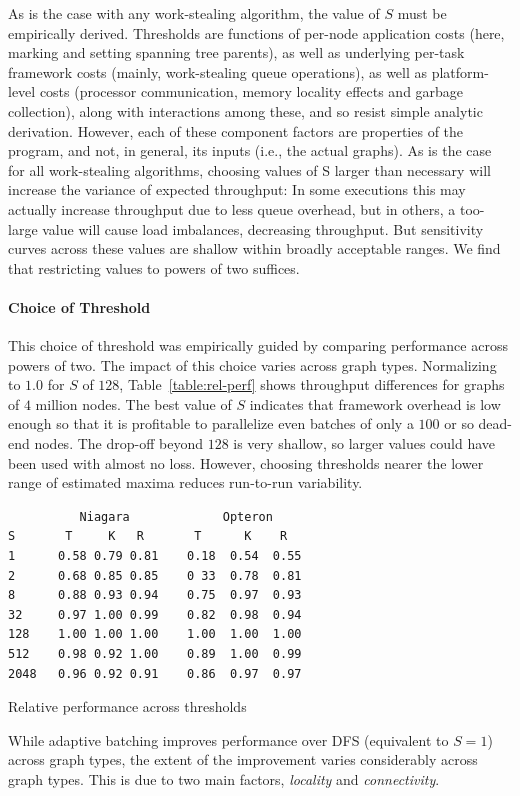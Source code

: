 As is the case with any work-stealing algorithm, the value of $S$ must
be empirically derived. Thresholds are functions of per-node
application costs (here, marking and setting spanning tree parents),
as well as underlying per-task framework costs (mainly, work-stealing
queue operations), as well as platform-level costs (processor
communication, memory locality effects and  garbage collection), along
with interactions among these, and so resist simple analytic
derivation.  However, each of these component factors are properties
of the program, and not, in general, its inputs (i.e., the actual
graphs).  As is the case for all work-stealing algorithms, choosing
values of S larger than necessary will increase the variance of
expected throughput: In some executions this may actually increase
throughput due to less queue overhead, but in others, a too-large
value will cause load imbalances, decreasing throughput.  But
sensitivity curves across these values are shallow within broadly
acceptable ranges. We find that restricting values to powers of two
suffices.

\paragraph{Choice of Threshold}

This choice of threshold was empirically guided by comparing
performance across powers of two. The impact of this choice varies
across graph types. Normalizing to $1.0$ for $S$ of $128$,
Table~\ref{table:rel-perf} shows throughput differences for graphs of
$4$ million nodes.  The best value of $S$ indicates that \XWS{} framework
overhead is low enough so that it is profitable to parallelize even batches
of only a $100$ or so dead-end nodes. The drop-off beyond $128$ is
very shallow, so larger values could have been used with almost no
loss.  However, choosing thresholds nearer the lower range of
estimated maxima reduces run-to-run variability.

\begin{table}
{\footnotesize
\begin{verbatim}
          Niagara             Opteron
S       T     K   R       T      K    R
1      0.58 0.79 0.81    0.18  0.54  0.55
2      0.68 0.85 0.85    0 33  0.78  0.81
8      0.88 0.93 0.94    0.75  0.97  0.93
32     0.97 1.00 0.99    0.82  0.98  0.94
128    1.00 1.00 1.00    1.00  1.00  1.00
512    0.98 0.92 1.00    0.89  1.00  0.99
2048   0.96 0.92 0.91    0.86  0.97  0.97
\end{verbatim}}
\caption{Relative performance across thresholds}\label{table:rel-perf}
\end{table}
While adaptive batching improves performance over DFS (equivalent to
$S=1$) across graph types, the extent of the improvement varies
considerably across graph types. This is due to two main factors,
{\em locality} and {\em connectivity}.

